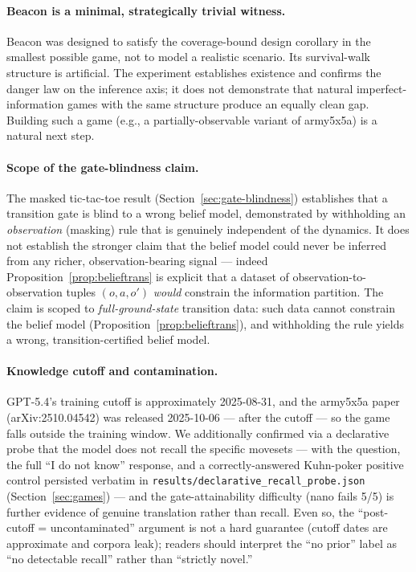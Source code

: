 \documentclass[11pt]{article}
\theoremstyle{remark}
\begin{document}
\paragraph{Beacon is a minimal, strategically trivial witness.} Beacon was designed to satisfy the coverage-bound design corollary in the smallest possible game, not to model a realistic scenario. Its survival-walk structure is artificial. The experiment establishes existence and confirms the danger law on the inference axis; it does not demonstrate that natural imperfect-information games with the same structure produce an equally clean gap. Building such a game (e.g., a partially-observable variant of army5x5a) is a natural next step.

\paragraph{Scope of the gate-blindness claim.} The masked tic-tac-toe result (Section~\ref{sec:gate-blindness}) establishes that a transition gate is blind to a wrong belief model, demonstrated by withholding an \emph{observation} (masking) rule that is genuinely independent of the dynamics. It does not establish the stronger claim that the belief model could never be inferred from any richer, observation-bearing signal --- indeed Proposition~\ref{prop:belieftrans} is explicit that a dataset of observation-to-observation tuples $(o,a,o')$ \emph{would} constrain the information partition. The claim is scoped to \emph{full-ground-state} transition data: such data cannot constrain the belief model (Proposition~\ref{prop:belieftrans}), and withholding the rule yields a wrong, transition-certified belief model.

\paragraph{Knowledge cutoff and contamination.} GPT-5.4's training cutoff is approximately 2025-08-31, and the army5x5a paper (arXiv:2510.04542) was released 2025-10-06 --- after the cutoff --- so the game falls outside the training window. We additionally confirmed via a declarative probe that the model does not recall the specific movesets --- with the question, the full ``I do not know'' response, and a correctly-answered Kuhn-poker positive control persisted verbatim in \texttt{results/declarative\_recall\_probe.json} (Section~\ref{sec:games}) --- and the gate-attainability difficulty (nano fails 5/5) is further evidence of genuine translation rather than recall. Even so, the ``post-cutoff = uncontaminated'' argument is not a hard guarantee (cutoff dates are approximate and corpora leak); readers should interpret the ``no prior'' label as ``no detectable recall'' rather than ``strictly novel.''
\end{document}
